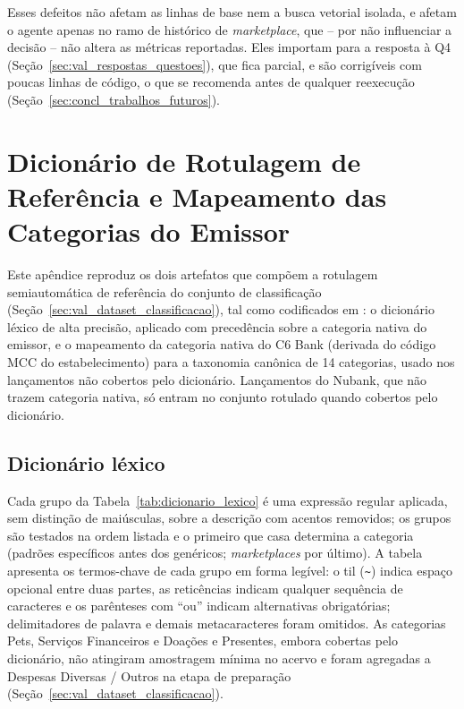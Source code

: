\begin{apendicesenv}
Esses defeitos não afetam as linhas de base nem a busca vetorial isolada, e afetam o agente apenas no ramo de histórico de \textit{marketplace}, que -- por não influenciar a decisão -- não altera as métricas reportadas. Eles importam para a resposta à Q4 (Seção~\ref{sec:val_respostas_questoes}), que fica parcial, e são corrigíveis com poucas linhas de código, o que se recomenda antes de qualquer reexecução (Seção~\ref{sec:concl_trabalhos_futuros}).


\chapter{Dicionário de Rotulagem de Referência e Mapeamento das Categorias do Emissor}
\label{apendice:rotulagem}

Este apêndice reproduz os dois artefatos que compõem a rotulagem semiautomática de referência do conjunto de classificação (Seção~\ref{sec:val_dataset_classificacao}), tal como codificados em : o dicionário léxico de alta precisão, aplicado com precedência sobre a categoria nativa do emissor, e o mapeamento da categoria nativa do C6 Bank (derivada do código MCC do estabelecimento) para a taxonomia canônica de 14 categorias, usado nos lançamentos não cobertos pelo dicionário. Lançamentos do Nubank, que não trazem categoria nativa, só entram no conjunto rotulado quando cobertos pelo dicionário.

\section{Dicionário léxico}

Cada grupo da Tabela~\ref{tab:dicionario_lexico} é uma expressão regular aplicada, sem distinção de maiúsculas, sobre a descrição com acentos removidos; os grupos são testados na ordem listada e o primeiro que casa determina a categoria (padrões específicos antes dos genéricos; \textit{marketplaces} por último). A tabela apresenta os termos-chave de cada grupo em forma legível: o til (\texttt{\textasciitilde}) indica espaço opcional entre duas partes, as reticências indicam qualquer sequência de caracteres e os parênteses com ``ou'' indicam alternativas obrigatórias; delimitadores de palavra e demais metacaracteres foram omitidos. As categorias Pets, Serviços Financeiros e Doações e Presentes, embora cobertas pelo dicionário, não atingiram amostragem mínima no acervo e foram agregadas a Despesas Diversas / Outros na etapa de preparação (Seção~\ref{sec:val_dataset_classificacao}).


\end{apendicesenv}
